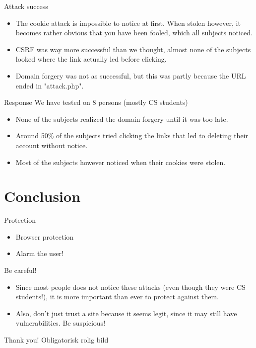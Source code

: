 \documentclass{beamer}
\begin{document}
\begin{frame}{Attack success}
    \begin{itemize}
        \item
            The cookie attack is impossible to notice at first. When stolen
            however, it becomes rather obvious that you have been fooled, which
            all subjects noticed.
        \item
            CSRF was way more successful than we thought, almost none of the
            subjects looked where the link actually led before clicking.
        \item
            Domain forgery was not as successful, but this was partly because
            the URL ended in "attack.php".
    \end{itemize}
\end{frame}

\begin{frame}{Response}
    We have tested on 8 persons (mostly CS students)
    \begin{itemize}
        \item None of the subjects realized the domain forgery until it was too
              late.
        \item Around 50\% of the subjects tried clicking the links that led to
              deleting their account without notice.
        \item Most of the subjects however noticed when their cookies were
              stolen.
    \end{itemize}
\end{frame}

\section{Conclusion}

\begin{frame}{Protection}
    \begin{itemize}
        \item Browser protection
        \item Alarm the user!
    \end{itemize}
\end{frame}

\begin{frame}{Be careful!}
    \begin{itemize}
        \item Since most people does not notice these attacks (even though they
              were CS students!), it is more important than ever to protect
              against them.
        \item Also, don't just trust a site because it seems legit, since it may
              still have vulnerabilities. Be suspicious!
    \end{itemize}
\end{frame}

\begin{frame}{Thank you!}
Obligatorisk rolig bild
\end{frame}
\end{document}
